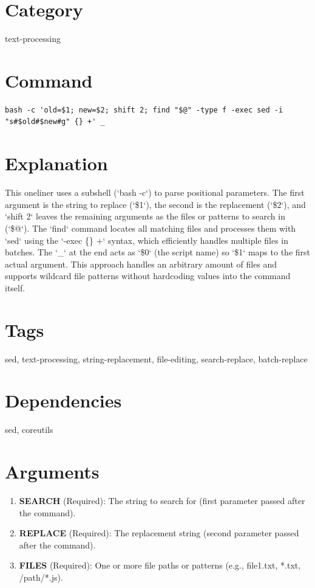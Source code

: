 \documentclass[openany]{book}
\begin{document}
\section*{Category}
text-processing

\section*{Command}
\begin{lstlisting}
bash -c 'old=$1; new=$2; shift 2; find "$@" -type f -exec sed -i "s#$old#$new#g" {} +' _
\end{lstlisting}

\section*{Explanation}
This oneliner uses a subshell (`bash -c`) to parse positional parameters. The first argument is the string to replace (`\$1`), the second is the replacement (`\$2`), and `shift 2` leaves the remaining arguments as the files or patterns to search in (`\$@`). The `find` command locates all matching files and processes them with `sed` using the `-exec \{\} +` syntax, which efficiently handles multiple files in batches. The `\_` at the end acts as `\$0` (the script name) so `\$1` maps to the first actual argument. This approach handles an arbitrary amount of files and supports wildcard file patterns without hardcoding values into the command itself.

\section*{Tags}
sed, text-processing, string-replacement, file-editing, search-replace, batch-replace

\section*{Dependencies}
sed, coreutils


\section*{Arguments}
\begin{enumerate}
  \item \textbf{SEARCH} (Required): The string to search for (first parameter passed after the command).
  \item \textbf{REPLACE} (Required): The replacement string (second parameter passed after the command).
  \item \textbf{FILES} (Required): One or more file paths or patterns (e.g., file1.txt, *.txt, /path/*.js).
\end{enumerate}
\end{document}
